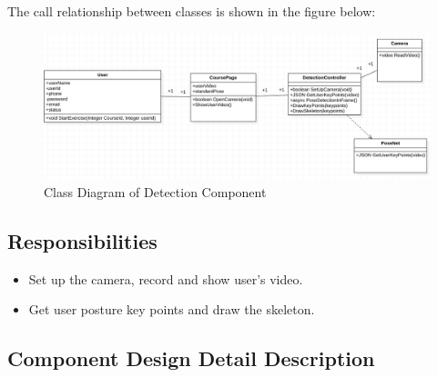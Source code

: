 \documentclass[16pt]{scrreprt}
\begin{document}
\noindent The call relationship between classes is shown in the figure below:
\begin{figure}[H]
    \centering
    \includegraphics[width=1.0\textwidth]{diagrams/detection.png}
    \caption{Class Diagram of Detection Component}
\end{figure}
\subsection{Responsibilities}
\begin{itemize}
    \item Set up the camera, record and show user's video.
    \item Get user posture key points and draw the skeleton. 
\end{itemize}

\subsection{Component Design Detail Description}
\end{document}
